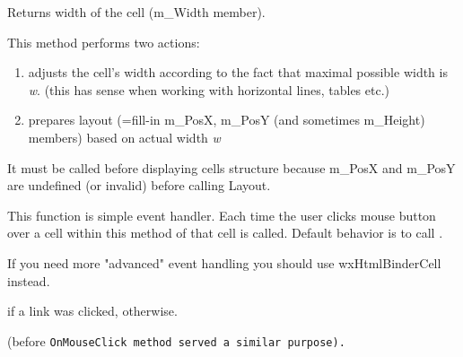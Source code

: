 Returns width of the cell (m\_Width member).

\label{wxhtmlcelllayout}


This method performs two actions:

\begin{enumerate}\itemsep=0pt
\item adjusts the cell's width according to the fact that maximal possible width is {\it w}.
(this has sense when working with horizontal lines, tables etc.)
\item prepares layout (=fill-in m\_PosX, m\_PosY (and sometimes m\_Height) members)
based on actual width {\it w}
\end{enumerate}

It must be called before displaying cells structure because
m\_PosX and m\_PosY are undefined (or invalid)
before calling Layout.

\label{wxhtmlcellprocessmouseclick}


This function is simple event handler. Each time the user clicks mouse button
over a cell within  this method of that
cell is called. Default behavior is to call
.


If you need more "advanced" event handling
you should use wxHtmlBinderCell instead.






\true if a link was clicked, \false otherwise.

 (before \tt{OnMouseClick} method served a similar purpose).


\label{wxhtmlcellsetid}


